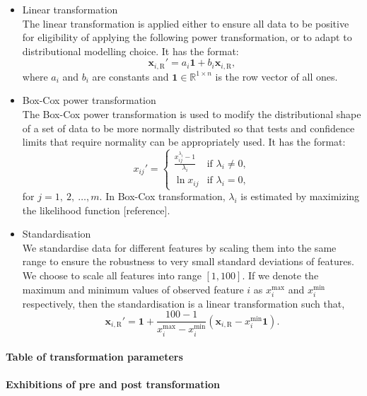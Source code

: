 \begin{itemize}
\item Linear transformation
\\The linear transformation is applied either to ensure all data to be positive for eligibility of applying the following power transformation, or to adapt to distributional modelling choice. It has the format:
\begin{equation}
\mathbf{x}_{i,\text{R}}' = a_i \mathbf{1} + b_i \mathbf{x}_{i,\text{R}},
\end{equation}
where $a_i$ and $b_i$ are constants and $\mathbf{1} \in \mathbb{R}^{1 \times n}$ is the row vector of all ones.
\item Box-Cox power transformation
\\The Box-Cox power transformation is used to modify the distributional shape of a set of data to be more normally distributed so that tests and confidence limits that require normality can be appropriately used. It has the format:
\begin{equation}
x_{ij}' = 
\begin{cases}
\frac{x_{ij}^{\lambda_i}-1}{\lambda_i} & \text{if } \lambda_i \neq 0, \\
\ln{x_{ij}} & \text{if } \lambda_i = 0,
\end{cases}
\end{equation}
for $j = 1, ~2, ~\dots, m$. In Box-Cox transformation, $\lambda_i$ is estimated by maximizing the likelihood function [reference].
\item Standardisation
\\We standardise data for different features by scaling them into the same range to ensure the robustness to very small standard deviations of features. We choose to scale all features into range $[1, 100]$. If we denote the maximum and minimum values of observed feature $i$ as $x_i^\text{max}$ and $x_i^\text{min}$ respectively, then the standardisation is a linear transformation such that,
\begin{equation}
\mathbf{x}_{i,\text{R}}' = \mathbf{1} + \frac{100-1}{x_i^\text{max}-x_i^\text{min}} \left( \mathbf{x}_{i,\text{R}} - x_i^\text{min} \mathbf{1} \right).
\end{equation}
\end{itemize}



\paragraph{Table of transformation parameters}

\paragraph{Exhibitions of pre and post transformation}